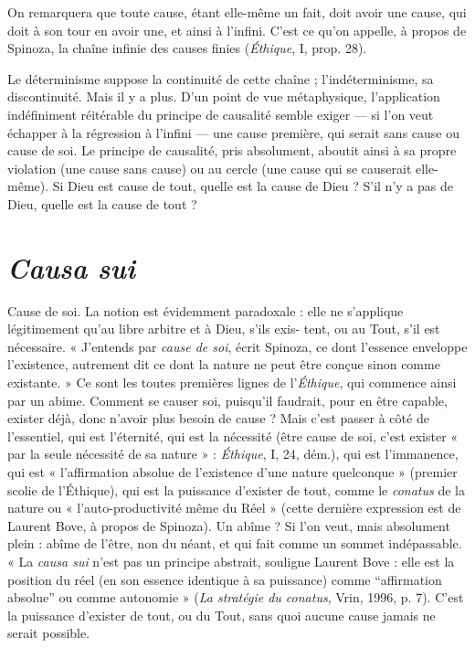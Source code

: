 On remarquera que toute cause, étant elle-même un fait, doit avoir une
cause, qui doit à son tour en avoir une, et ainsi à l’infini. C’est ce qu’on appelle,
à propos de Spinoza, la chaîne infinie des causes finies ({\it Éthique}, I, prop. 28).

Le déterminisme suppose la continuité de cette chaîne ; l’indéterminisme, sa
discontinuité. Mais il y a plus. D’un point de vue métaphysique, l’application
indéfiniment réitérable du principe de causalité semble exiger — si l’on veut
échapper à la régression à l’infini — une cause première, qui serait sans cause ou
cause de soi. Le principe de causalité, pris absolument, aboutit ainsi à sa propre
violation (une cause sans cause) ou au cercle (une cause qui se causerait elle-même).
Si Dieu est cause de tout, quelle est la cause de Dieu ? S’il n’y a pas de
Dieu, quelle est la cause de tout ?

\section{\it Causa sui}
Cause de soi. La notion est évidemment paradoxale : elle ne
s'applique légitimement qu’au libre arbitre et à Dieu, s’ils exis-
tent, ou au Tout, s’il est nécessaire. « J'entends par {\it cause de soi}, écrit Spinoza,
ce dont l’essence enveloppe l'existence, autrement dit ce dont la nature ne peut
être conçue sinon comme existante. » Ce sont les toutes premières lignes de
l’{\it Éthique}, qui commence ainsi par un abime. Comment se causer soi, puisqu'il
faudrait, pour en être capable, exister déjà, donc n’avoir plus besoin de cause ?
Mais c’est passer à côté de l'essentiel, qui est l’éternité, qui est la nécessité (être
cause de soi, c’est exister « par la seule nécessité de sa nature » : {\it Éthique}, I, 24,
dém.), qui est l’immanence, qui est « l'affirmation absolue de l’existence d’une
nature quelconque » (premier scolie de l’Éthique), qui est la puissance d’exister
de tout, comme le {\it conatus} de la nature ou « l’auto-productivité même du Réel »
(cette dernière expression est de Laurent Bove, à propos de Spinoza). Un
abîme ? Si l’on veut, mais absolument plein : abîme de l'être, non du néant, et
qui fait comme un sommet indépassable. « La {\it causa sui} n’est pas un principe
abstrait, souligne Laurent Bove : elle est la position du réel (en son essence
identique à sa puissance) comme “affirmation absolue” ou comme autonomie »
({\it La stratégie du conatus}, Vrin, 1996, p. 7). C’est la puissance d’exister de tout,
ou du Tout, sans quoi aucune cause jamais ne serait possible.

